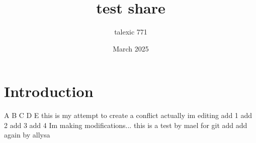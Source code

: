 \documentclass{article}
\title{test share}
\author{talexic 771 }
\date{March 2025}
\begin{document}
\maketitle

\section{Introduction}
A
B
C
D
E
this is my attempt to create a conflict
actually im editing
add 1
add 2
add 3
add 4
Im making modifications... 
this is a test by mael for git
add
add again by allysa
\end{document}
